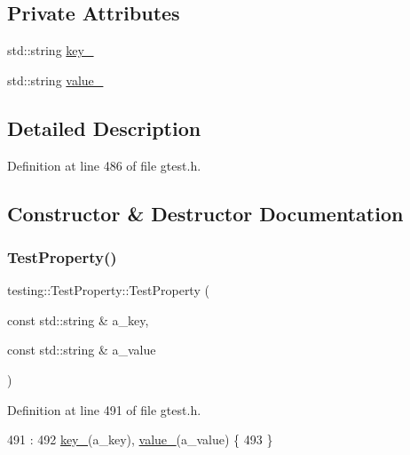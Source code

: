 \subsection*{Private Attributes}
\begin{DoxyCompactItemize}
\item 
std\+::string \hyperlink{classtesting_1_1TestProperty_a948544067d61e790bd37e234186fa708}{key\+\_\+}
\item 
std\+::string \hyperlink{classtesting_1_1TestProperty_a204e3793205a1e61412fc34be1913c01}{value\+\_\+}
\end{DoxyCompactItemize}


\subsection{Detailed Description}


Definition at line 486 of file gtest.\+h.



\subsection{Constructor \& Destructor Documentation}
\mbox{\label{classtesting_1_1TestProperty_a25a0ccf1c75a92af46a48d3c2a873e6d}} 
\subsubsection{\texorpdfstring{Test\+Property()}{TestProperty()}}
{\footnotesize\ttfamily testing\+::\+Test\+Property\+::\+Test\+Property (\begin{DoxyParamCaption}\item[{const std\+::string \&}]{a\+\_\+key,  }\item[{const std\+::string \&}]{a\+\_\+value }\end{DoxyParamCaption})\hspace{0.3cm}{\ttfamily [inline]}}



Definition at line 491 of file gtest.\+h.


\begin{DoxyCode}
491                                                                  :
492     \hyperlink{classtesting_1_1TestProperty_a948544067d61e790bd37e234186fa708}{key\_}(a\_key), \hyperlink{classtesting_1_1TestProperty_a204e3793205a1e61412fc34be1913c01}{value\_}(a\_value) \{
493   \}
\end{DoxyCode}


